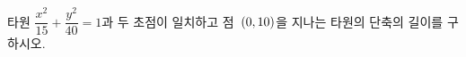 타원 $\dfrac{x^2}{15}+\dfrac{y^2}{40}=1$과 두 초점이 일치하고 점~$(0{,}\mkern3mu\mathopen{}10)$을 지나는 타원의 단축의 길이를 구하시오.
